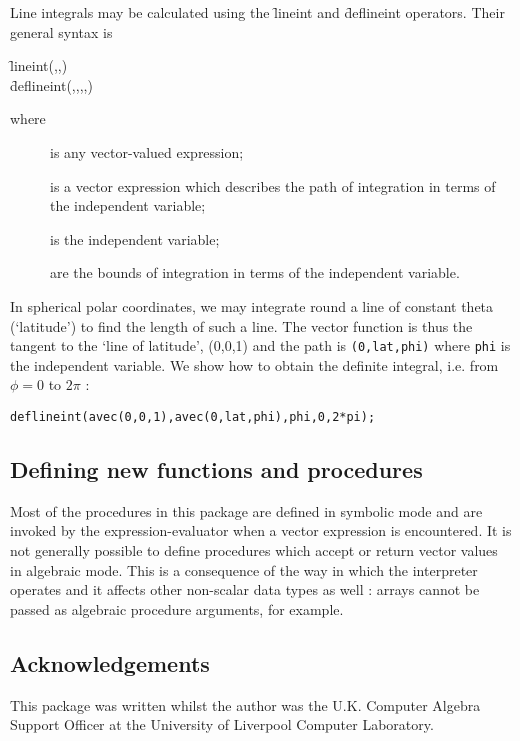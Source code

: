  
\hypertarget{operator:LINEINT}{}\hypertarget{operator:DEFLINEINT}{}
 
Line integrals may be calculated using the \f{lineint} and \f{deflineint}
operators. Their general syntax is
\begin{syntax}
  \f{lineint}(,,) \\
  \f{deflineint}(,,,,)  
\end{syntax}
where
\begin{description}
\item[] is any vector-valued expression;
\item[] is a vector expression which describes the path of
integration in terms of the independent variable;
\item[] is the independent variable;
\item[]
\item[] are the bounds of integration in terms of the
independent variable.
\end{description}

\example{}

In spherical polar coordinates, we may integrate round a line of
constant theta (`latitude') to find the length of such a line. The
vector function is thus the tangent to the `line of latitude', (0,0,1)
and the path is \texttt{(0,lat,phi)} where \texttt{phi} is the independent
variable. We show how to obtain the definite integral, i.e. from
$\phi=0$ to $2 \pi$ :
\begin{verbatim}
deflineint(avec(0,0,1),avec(0,lat,phi),phi,0,2*pi);
\end{verbatim}

\subsection{Defining new functions and procedures}

Most of the procedures in this package are defined in symbolic mode
and are invoked by the \REDUCE expression-evaluator when a vector
expression is encountered. It is not generally possible to define
procedures which accept or return vector values in algebraic mode.
This is a consequence of the way in which the \REDUCE interpreter
operates and it affects other non-scalar data types as well : arrays
cannot be passed as algebraic procedure arguments, for example.

\subsection{Acknowledgements}

This package was written whilst the author was the U.K. Computer
Algebra Support Officer at the University of Liverpool Computer Laboratory.
